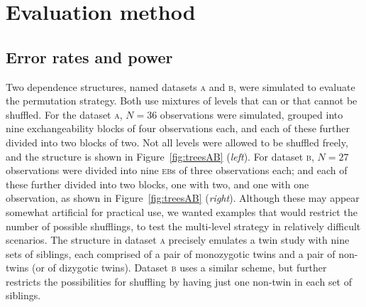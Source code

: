 \section{Evaluation method}
\label{sec:ptree:evaluation}

\subsection{Error rates and power}

Two dependence structures, named datasets \textsc{a} and \textsc{b}, were simulated to evaluate the permutation strategy. Both use mixtures of levels that can or that cannot be shuffled. For the dataset \textsc{a}, $N=36$ observations were simulated, grouped into nine exchangeability blocks of four observations each, and each of these further divided into two blocks of two. Not all levels were allowed to be shuffled freely, and the structure is shown in Figure~\ref{fig:treesAB} (\emph{left}). For dataset \textsc{b}, $N=27$ observations were divided into nine \textsc{eb}s of three observations each; and each of these further divided into two blocks, one with two, and one with one observation, as shown in Figure~\ref{fig:treesAB} (\emph{right}). Although these may appear somewhat artificial for practical use, we wanted examples that would restrict the number of possible shufflings, to test the multi-level strategy in relatively difficult scenarios. The structure in dataset \textsc{a} precisely emulates a twin study with nine sets of siblings, each comprised of a pair of monozygotic twins and a pair of non-twins (or of dizygotic twins). Dataset \textsc{b} uses a similar scheme, but further restricts the possibilities for shuffling by having just one non-twin in each set of siblings.

